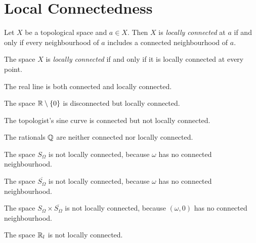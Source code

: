 \section{Local Connectedness}

\begin{definition}
    Let $X$ be a topological space and $a \in X$. Then $X$ is \emph{locally
    connected} at $a$ if and only if every neighbourhood of $a$ includes a
    connected neighbourhood of $a$.

    The space $X$ is \emph{locally connected} if and only if it is locally
    connected at every point.
\end{definition}

\begin{example}
    The real line is both connected and locally connected.
\end{example}

\begin{example}
    The space $\mathbb{R} \setminus \{0\}$ is disconnected but locally connected.
\end{example}

\begin{example}
    The topologist's sine curve is connected but not locally connected.
\end{example}

\begin{example}
    The rationals $\mathbb{Q}$ are neither connected nor locally connected.
\end{example}

\begin{example}
    The space $S_\Omega$ is not locally connected, because $\omega$ has no connected neighbourhood.
\end{example}

\begin{example}
    The space $\overline{S_\Omega}$ is not locally connected, because $\omega$ has no connected neighbourhood.
\end{example}

\begin{example}
    The space $S_\Omega \times \overline{S_\Omega}$ is not locally connected, because $(\omega,0)$ has no connected neighbourhood.
\end{example}

\begin{example}
    The space $\mathbb{R}_l$ is not locally connected.
\end{example}

